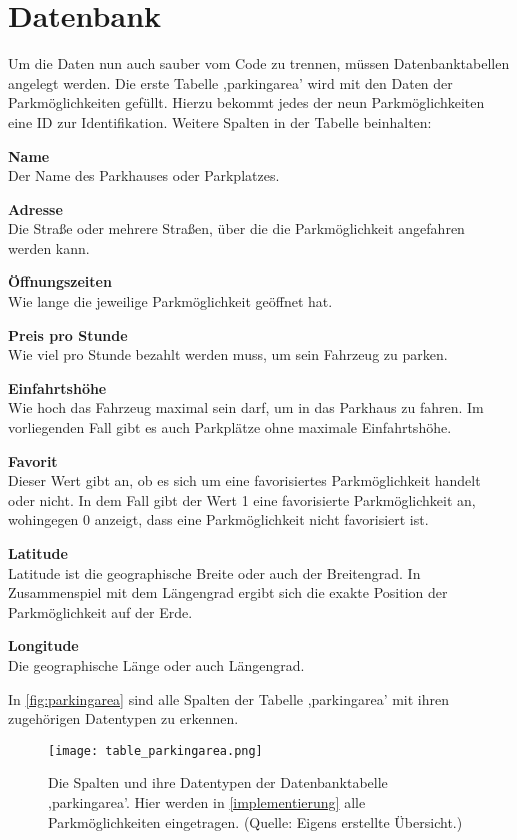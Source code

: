 \section{Datenbank}
Um die Daten nun auch sauber vom Code zu trennen, müssen Datenbanktabellen angelegt werden. Die erste Tabelle ,parkingarea' wird mit den Daten der Parkmöglichkeiten gefüllt. Hierzu bekommt jedes der neun Parkmöglichkeiten eine ID zur Identifikation. Weitere Spalten in der Tabelle beinhalten:
\begin{description}
	\item \textbf{Name} \\ Der Name des Parkhauses oder Parkplatzes.
	\item \textbf{Adresse} \\ Die Straße oder mehrere Straßen, über die die Parkmöglichkeit angefahren werden kann.
	\newpage
	\item \textbf{Öffnungszeiten} \\ Wie lange die jeweilige Parkmöglichkeit geöffnet hat.
	\item \textbf{Preis pro Stunde} \\ Wie viel pro Stunde bezahlt werden muss, um sein Fahrzeug zu parken.
	\item \textbf{Einfahrtshöhe} \\ Wie hoch das Fahrzeug maximal sein darf, um in das Parkhaus zu fahren. Im vorliegenden Fall gibt es auch Parkplätze ohne maximale Einfahrtshöhe.
	\item \textbf{Favorit} \\ Dieser Wert gibt an, ob es sich um eine favorisiertes Parkmöglichkeit handelt oder nicht. In dem Fall gibt der Wert 1 eine favorisierte Parkmöglichkeit an, wohingegen 0 anzeigt, dass eine Parkmöglichkeit nicht favorisiert ist.
	\item \textbf{Latitude} \\ Latitude ist die geographische Breite oder auch der Breitengrad. In Zusammenspiel mit dem Längengrad ergibt sich die exakte Position der Parkmöglichkeit auf der Erde.
	\item \textbf{Longitude} \\ Die geographische Länge oder auch Längengrad.
\end{description}
In \autoref{fig:parkingarea} sind alle Spalten der Tabelle ,parkingarea' mit ihren zugehörigen Datentypen zu erkennen.

\begin{figure}[h]
	\centering
	\texttt{[image: table\_parkingarea.png]}
	\caption[Die Spalten und ihre Datentypen der Datenbanktabelle ,parkingarea'. Hier werden in \autoref{implementierung} alle Parkmöglichkeiten eingetragen.]
	{Die Spalten und ihre Datentypen der Datenbanktabelle ,parkingarea'. Hier werden in \autoref{implementierung} alle Parkmöglichkeiten eingetragen. (Quelle: Eigens erstellte Übersicht.)}
	\label{fig:parkingarea}
\end{figure}

